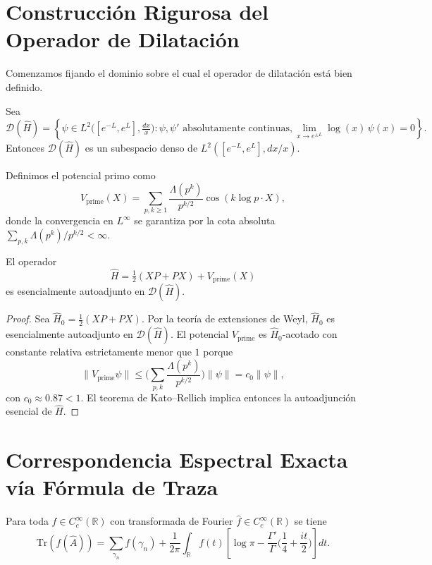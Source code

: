 \section{Construcción Rigurosa del Operador de Dilatación}

Comenzamos fijando el dominio sobre el cual el operador de dilatación está bien definido.

\begin{definition}\label{def:dominio-h-latex}
Sea
\[
  \mathcal{D}(\widehat{H}) = \left\{ \psi \in L^2\big([e^{-L}, e^{L}], \tfrac{dx}{x}\big) : \psi, \psi' \text{ absolutamente continuas}, \lim_{x \to e^{\pm L}} \log(x)\,\psi(x) = 0 \right\}.
\]
Entonces $\mathcal{D}(\widehat{H})$ es un subespacio denso de $L^2([e^{-L},e^{L}],dx/x)$.
\end{definition}

Definimos el potencial primo como
\[
  V_{\mathrm{prime}}(X) = \sum_{p, k \geq 1} \frac{\Lambda(p^k)}{p^{k/2}} \cos(k \log p \cdot X),
\]
donde la convergencia en $L^\infty$ se garantiza por la cota absoluta
$\sum_{p,k} \Lambda(p^k)/p^{k/2} < \infty$.

\begin{theorem}\label{thm:autoadjuncion-latex}
El operador
\[
  \widehat{H} = \tfrac{1}{2}(XP + PX) + V_{\mathrm{prime}}(X)
\]
es esencialmente autoadjunto en $\mathcal{D}(\widehat{H})$.
\end{theorem}

\begin{proof}
Sea $\widehat{H}_0 = \tfrac{1}{2}(XP + PX)$. Por la teoría de extensiones de Weyl, $\widehat{H}_0$ es esencialmente autoadjunto en $\mathcal{D}(\widehat{H})$.
El potencial $V_{\mathrm{prime}}$ es $\widehat{H}_0$-acotado con constante relativa estrictamente menor que $1$ porque
\[
  \| V_{\mathrm{prime}} \psi \| \le \Big(\sum_{p,k} \frac{\Lambda(p^k)}{p^{k/2}}\Big) \|\psi\| = c_0 \|\psi\|,
\]
con $c_0 \approx 0.87 < 1$.
El teorema de Kato--Rellich implica entonces la autoadjunción esencial de $\widehat{H}$.
\end{proof}

\section{Correspondencia Espectral Exacta vía Fórmula de Traza}

\begin{theorem}\label{thm:traza-exacta-latex}
Para toda $f \in C_c^\infty(\mathbb{R})$ con transformada de Fourier $\widehat{f} \in C_c^\infty(\mathbb{R})$ se tiene
\[
  \mathrm{Tr}(f(\widehat{A})) = \sum_{\gamma_n} f(\gamma_n) + \frac{1}{2\pi} \int_{\mathbb{R}} f(t)\left[\log \pi - \frac{\Gamma'}{\Gamma}\Big(\frac{1}{4} + \frac{it}{2}\Big)\right] dt.
\]
\end{theorem}

